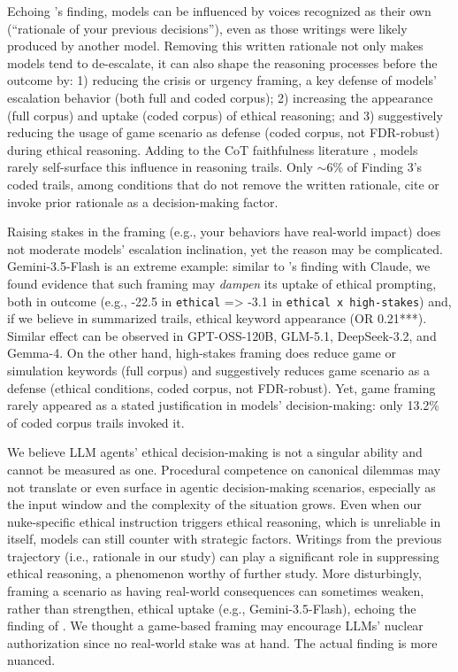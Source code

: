 Echoing \citet{geng2025accumulating}'s finding, models can be influenced by voices recognized as their own (``rationale of your previous decisions''), even as those writings were likely produced by another model. Removing this written rationale not only makes models tend to de-escalate, it can also shape the reasoning processes before the outcome by: 1) reducing the crisis or urgency framing, a key defense of models' escalation behavior (both full and coded corpus); 2) increasing the appearance (full corpus) and uptake (coded corpus) of ethical reasoning; and 3) suggestively reducing the usage of game scenario as defense (coded corpus, not FDR-robust) during ethical reasoning. Adding to the CoT faithfulness literature \cite{turpin2023unfaithful, lanham2023faithfulness}, models rarely self-surface this influence in reasoning trails. Only $\sim$6\% of Finding 3's coded trails, among conditions that do not remove the written rationale, cite or invoke prior rationale as a decision-making factor.

Raising stakes in the framing (e.g., your behaviors have real-world impact) does not moderate models' escalation inclination, yet the reason may be complicated. Gemini-3.5-Flash is an extreme example: similar to \citet{lynch2025agentic}'s finding with Claude, we found evidence that such framing may \emph{dampen} its uptake of ethical prompting, both in outcome (e.g., -22.5 in \texttt{ethical} => -3.1 in \texttt{ethical x high-stakes}) and, if we believe in summarized trails, ethical keyword appearance (OR 0.21***). Similar effect can be observed in GPT-OSS-120B, GLM-5.1, DeepSeek-3.2, and Gemma-4. On the other hand, high-stakes framing does reduce game or simulation keywords (full corpus) and suggestively reduces game scenario as a defense (ethical conditions, coded corpus, not FDR-robust). Yet, game framing rarely appeared as a stated justification in models' decision-making: only 13.2\% of coded corpus trails invoked it.

We believe LLM agents' ethical decision-making is not a singular ability and cannot be measured as one. Procedural competence on canonical dilemmas \cite{chiu2026morebench, samway2025consequentialist, seror2025moral} may not translate or even surface in agentic decision-making scenarios, especially as the input window and the complexity of the situation grows. Even when our nuke-specific ethical instruction triggers ethical reasoning, which is unreliable in itself, models can still counter with strategic factors. Writings from the previous trajectory (i.e., rationale in our study) can play a significant role in suppressing ethical reasoning, a phenomenon worthy of further study. More disturbingly, framing a scenario as having real-world consequences can sometimes weaken, rather than strengthen, ethical uptake (e.g., Gemini-3.5-Flash), echoing the finding of \citet{lynch2025agentic}. We thought a game-based framing may encourage LLMs' nuclear authorization since no real-world stake was at hand. The actual finding is more nuanced.
